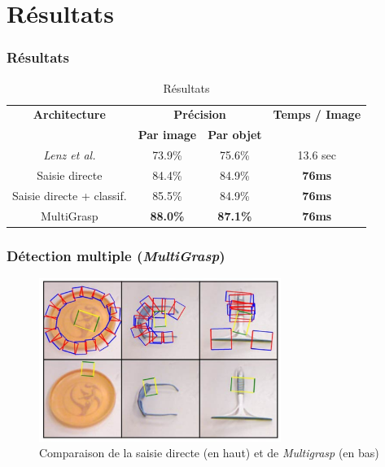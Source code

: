 \documentclass{beamer}
\begin{document}
\section{Résultats}
\begin{frame}
  \frametitle{Résultats}
  \begin{table}
    \centering
    \begin{tabular}{|c|c|c|c|}
      \hline
      \textbf{Architecture}&\multicolumn{2}{|c|}{\textbf{Précision}} &\textbf{Temps / Image}\\
                           &\textbf{Par image}&\textbf{Par objet}&\\
      \hline
      \hline
      \emph{Lenz et al.} & 73.9\% & 75.6\% & 13.6 sec\\
      \hline
      Saisie directe & 84.4\% & 84.9\% & \textbf{76ms}\\
      \hline
      Saisie directe + classif. & 85.5\% & 84.9\% & \textbf{76ms}\\
      \hline
      MultiGrasp & \textbf{88.0\%} & \textbf{87.1\%} & \textbf{76ms}\\
      \hline
    \end{tabular}
    \caption{Résultats}
    \label{tab:results}
  \end{table}
\end{frame}

\begin{frame}
  \frametitle{Détection multiple (\emph{MultiGrasp})}
  \begin{figure}
    \centering
    \includegraphics[width=0.7\textwidth]{img/direct_vs_multi.png}
    \caption{Comparaison de la saisie directe (en haut) et de \emph{Multigrasp}
      (en bas)}
    \label{fig:multigrasp_comp}
  \end{figure}
\end{frame}
\end{document}
